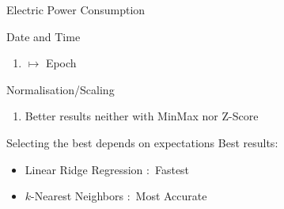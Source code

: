 \begin{frame}{Electric Power Consumption}


\begin{tcolorbox}[colback=LightSteelBlue!5,colframe=yellow!40!black,title=Facts]

\bi
\mi Date and Time 
\begin{enumerate}
    \item $\mapsto$ Epoch
  \end{enumerate}
  
  \mi Normalisation/Scaling 
\begin{enumerate}
    \item Better results neither with MinMax nor Z-Score
  \end{enumerate}
 
\mi Selecting the best depends on expectations
  \mi Best results:
  \begin{itemize}
    \item Linear Ridge Regression $:$ Fastest
    \item $k$-Nearest Neighbors $:$ Most Accurate
  \end{itemize}
\ei


\end{tcolorbox}

\end{frame}